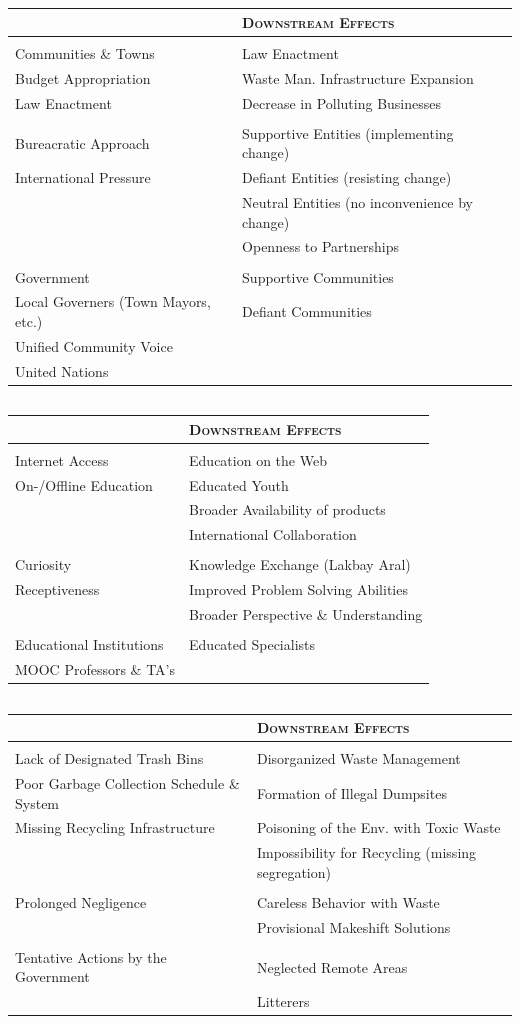 \documentclass{article}
\newenvironment{SATAnalysis}{
  \vspace{0.25cm}
  \begin{tabular}{>{\raggedright\arraybackslash}p{0.45\textwidth} >{\raggedleft\arraybackslash}p{0.45\textwidth}}
  {\Large \textsc{Upstream Causes}} & {\Large \textsc{Downstream Effects}}\\
}{
  \bottomrule
  \end{tabular}
  \vspace{0.5cm}
}
\newcommand{\SATStructural}{\midrule\multicolumn{2}{c}{\Large \textsc{Structural}}\\ \midrule}
\newcommand{\SATAttitudinal}{\midrule\multicolumn{2}{c}{\Large \textsc{Attitudinal}}\\ \midrule}
\newcommand{\SATTransactional}{\midrule\multicolumn{2}{c}{\Large \textsc{Transactional}}\\ \midrule}
\newcommand{\SATCause}[1]{#1 & \\}
\newcommand{\SATEffect}[1]{ & #1\\}
\newcommand{\SATCauseEffect}[2]{#1 & #2\\}
\begin{document}
\subsection{}
\begin{SATAnalysis}
  \SATStructural
  \SATCauseEffect{Communities \& Towns}{Law Enactment}
  \SATCauseEffect{Budget Appropriation}{Waste Man. Infrastructure Expansion}
  \SATCauseEffect{Law Enactment}{Decrease in Polluting Businesses}
  \SATAttitudinal
  \SATCauseEffect{Bureacratic Approach}{Supportive Entities (implementing change)}
  \SATCauseEffect{International Pressure}{Defiant Entities (resisting change)}
  \SATEffect{Neutral Entities (no inconvenience by change)}
  \SATEffect{Openness to Partnerships}
  \SATTransactional
  \SATCauseEffect{Government}{Supportive Communities}
  \SATCauseEffect{Local Governers (Town Mayors, etc.)}{Defiant Communities}
  \SATCause{Unified Community Voice}
  \SATCause{United Nations}
\end{SATAnalysis}

\subsection{}
\begin{SATAnalysis}
  \SATStructural
  \SATCauseEffect{Internet Access}{Education on the Web}
  \SATCauseEffect{On-/Offline Education}{Educated Youth}
  \SATEffect{Broader Availability of products}
  \SATEffect{International Collaboration}
  \SATAttitudinal
  \SATCauseEffect{Curiosity}{Knowledge Exchange (Lakbay Aral)}
  \SATCauseEffect{Receptiveness}{Improved Problem Solving Abilities}
  \SATEffect{Broader Perspective \& Understanding}
  \SATTransactional
  \SATCauseEffect{Educational Institutions}{Educated Specialists}
  \SATCause{MOOC Professors \& TA's}
\end{SATAnalysis}

\subsection{}
\begin{SATAnalysis}
  \SATStructural
  \SATCauseEffect{Lack of Designated Trash Bins}{Disorganized Waste Management}
  \SATCauseEffect{Poor Garbage Collection Schedule \& System}{Formation of Illegal Dumpsites}
  \SATCauseEffect{Missing Recycling Infrastructure}{Poisoning of the Env. with Toxic Waste}
  \SATEffect{Impossibility for Recycling (missing segregation)}
  \SATAttitudinal
  \SATCauseEffect{Prolonged Negligence}{Careless Behavior with Waste}
  \SATEffect{Provisional Makeshift Solutions}
  \SATTransactional
  \SATCauseEffect{Tentative Actions by the Government}{Neglected Remote Areas}
  \SATEffect{Litterers}
\end{SATAnalysis}
\end{document}
